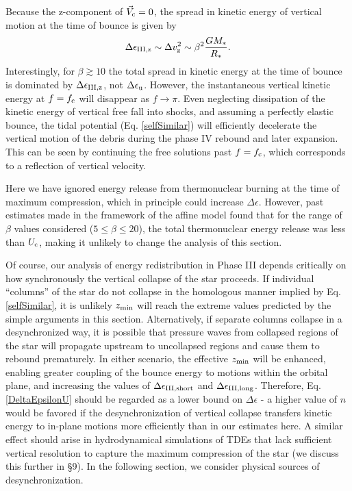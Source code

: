 \documentclass[useAMS, twocolumn, usenatbib]{mn2e}
\begin{document}
Because the z-component of $ \vec{V}_{\rm c} =0$, the spread in kinetic energy of vertical motion at the time of bounce is given by
\begin{equation}
\Delta \epsilon_{\rm III, z} \sim \Delta v_{\rm z}^2 \sim \beta^2 \frac{GM_{\rm *}}{R_*}.
\end{equation}
Interestingly, for $\beta \gtrsim 10$ the total spread in kinetic energy at the time of bounce is dominated by $\Delta\epsilon_{\rm III, z}$, not $\Delta\epsilon_{\rm u}$.  However, the instantaneous vertical kinetic energy at $f=f_{\rm c}$ will disappear as $f \to \pi$.  Even neglecting dissipation of the kinetic energy of vertical free fall into shocks, and assuming a perfectly elastic bounce, the tidal potential (Eq. \ref{selfSimilar}) will efficiently decelerate the vertical motion of the debris during the phase IV rebound and later expansion.  This can be seen by continuing the free solutions past $f=f_{\rm c}$, which corresponds to a reflection of vertical velocity.

Here we have ignored energy release from thermonuclear burning at the time of maximum compression, which in principle could increase $\Delta \epsilon$.  However, past estimates made in the framework of the affine model \citep[Table 8]{LuminetPichon89} found that for the range of $\beta$ values considered ($5 \le \beta \le 20$), the total thermonuclear energy release was less than $U_{\rm c}$, making it unlikely to change the analysis of this section.

Of course, our analysis of energy redistribution in Phase III depends critically on how synchronously the vertical collapse of the star proceeds.  If individual ``columns'' of the star do not collapse in the homologous manner implied by Eq. \ref{selfSimilar}, it is unlikely $z_{\rm min}$ will reach the extreme values predicted by the simple arguments in this section.  Alternatively, if separate columns collapse in a desynchronized way, it is possible that pressure waves from collapsed regions of the star will propagate upstream to uncollapsed regions and cause them to rebound prematurely.  In either scenario, the effective $z_{\rm min}$ will be enhanced, enabling greater coupling of the bounce energy to motions within the orbital plane, and increasing the values of $\Delta\epsilon_{\rm III, short}$ and $\Delta\epsilon_{\rm III, long}$.  Therefore, Eq. \ref{DeltaEpsilonU} should be regarded as a lower bound on $\Delta \epsilon$ - a higher value of $n$ would be favored if  the desynchronization of vertical collapse transfers kinetic energy to in-plane motions more efficiently than in our estimates here.  A similar effect should arise in hydrodynamical simulations of TDEs that lack sufficient vertical resolution to capture the maximum compression of the star (we discuss this further in \S 9).  In the following section, we consider physical sources of desynchronization.
\end{document}
